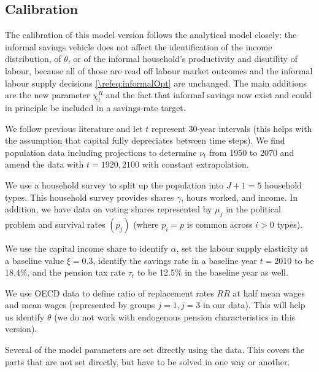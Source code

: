 \documentclass[a4paper]{article}
\begin{document}
\subsection{Calibration}\label{\refsec:calibration}
The calibration of this model version follows the analytical model closely: the informal savings vehicle does not affect the identification of the income distribution, of $\theta$, or of the informal household's productivity and disutility of labour, because all of those are read off labour market outcomes and the informal labour supply decisions \eqref{\refeq:informalOpt} are unchanged. The main additions are the new parameter $\chi_t^R$ and the fact that informal savings now exist and could in principle be included in a savings-rate target.

We follow previous literature and let $t$ represent 30-year intervals (this helps with the assumption that capital fully depreciates between time steps). We find population data including projections to determine $\nu_t$ from 1950 to 2070 and amend the data with $t = 1920, 2100$ with constant extrapolation.

We use a household survey to split up the population into $J+1 = 5$ household types. This household survey provides shares $\gamma$, hours worked, and income. In addition, we have data on voting shares represented by $\mu_j$ in the political problem and survival rates $(p_j)$ (where $p_i = p$ is common across $i>0$ types).

We use the capital income share to identify $\alpha$, set the labour supply elasticity at a baseline value $\xi = 0.3$, identify the savings rate in a baseline year $t=2010$ to be 18.4\%, and the pension tax rate $\tau_t$ to be 12.5\% in the baseline year as well.

We use OECD data to define ratio of replacement rates $RR$ at half mean wages and mean wages (represented by groups $j=1, j=3$ in our data). This will help us identify $\theta$ (we do not work with endogenous pension characteristics in this version).


Several of the model parameters are set directly using the data. This covers the parts that are not set directly, but have to be solved in one way or another.
\end{document}
